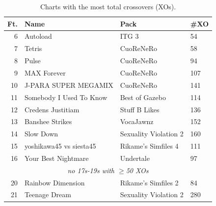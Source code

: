 \documentclass[10pt]{sigplanconf}
\begin{document}
\begin{table}[t]
	\begin{center}
		\small
	\begin{tabular}{r|l|l|l}
		\bf Ft. & \bf Name & \bf Pack & \bf \#XO \\
		\hline
		 6 & Autoload                 & ITG 3                 &  54 \\
		 7 & Tetris                   & CuoReNeRo             &  58 \\
		 8 & Pulse                    & CuoReNeRo             &  94 \\
		 9 & MAX Forever              & CuoReNeRo             & 107 \\
		10 & J-PARA SUPER MEGAMIX     & CuoReNeRo             & 141 \\
		11 & Somebody I Used To Know  & Best of Gazebo        & 114 \\
		12 & Credens Justitiam        & Stuff B Likes         & 136 \\
		13 & Banshee Strikes          & VocaJawnz             & 152 \\
		14 & Slow Down                & Sexuality Violation 2 & 160 \\
		15 & yoshikawa45 vs siesta45  & Rikame's Simfiles 4   & 111 \\
		16 & Your Best Nightmare      & Undertale             &  97 \\
		\multicolumn{4}{c}{\em no 17s-19s with $\ge$50 XOs} \\
		20 & Rainbow Dimension        & Rikame's Simfiles 2   &  84 \\
		21 & Teenage Dream            & Sexuality Violation 2 & 280 \\
	\end{tabular}
	\end{center}
	\caption{Charts with the most total crossovers (XOs).}
\end{table}
\end{document}
